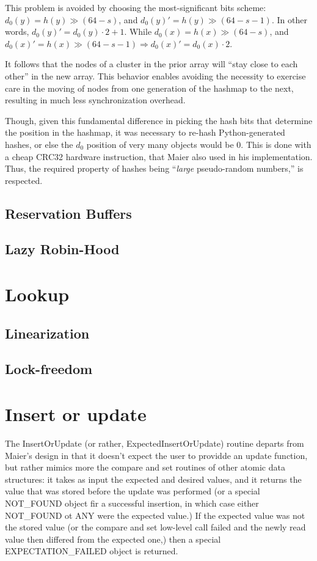 This problem is avoided by choosing the most-significant bits scheme: $d_0(y) = h(y) \gg (64 - s)$, and $d_0(y)' = h(y) \gg (64 - s - 1)$.
In other words, $d_0(y)' = d_0(y) \cdot 2 + 1$.
While $d_0(x) = h(x) \gg (64 - s)$, and $d_0(x)' = h(x) \gg (64 - s - 1) \Rightarrow d_0(x)' = d_0(x) \cdot 2$.

It follows that the nodes of a cluster in the prior array will ``stay close to each other'' in the new array.
This behavior enables avoiding the necessity to exercise care in the moving of nodes from one generation of the hashmap to the next, resulting in much less synchronization overhead.

Though, given this fundamental difference in picking the hash bits that determine the position in the hashmap, it was necessary to re-hash Python-generated hashes, or else the $d_0$ position of very many objects would be $0$.
This is done with a cheap CRC32 hardware instruction, that Maier also used in his implementation.
Thus, the required property of hashes being ``\emph{large} pseudo-random numbers,'' is respected.

\subsection{Reservation Buffers}

\subsection{Lazy Robin-Hood}

\cite[CMPXCHG--Compare and Exchange]{x86-64}



\section{Lookup}
\subsection{Linearization}
\subsection{Lock-freedom}

\section{Insert or update}

The InsertOrUpdate (or rather, ExpectedInsertOrUpdate) routine departs from Maier's design in that it doesn't expect the user to providde an update function, but rather mimics more the compare and set routines of other atomic data structures: it takes as input the expected and desired values, and it returns the value that was stored before the update was performed (or a special NOT\_FOUND object fir a successful insertion, in which case either NOT\_FOUND ot ANY were the expected value.)
If the expected value was not the stored value (or the compare and set low-level call failed and the newly read value then differed from the expected one,) then a special EXPECTATION\_FAILED object is returned.

